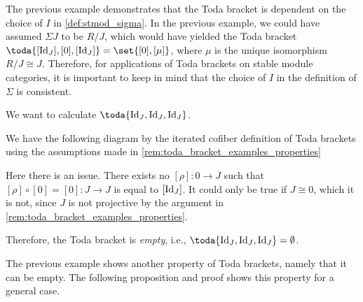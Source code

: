 The previous example demonstrates that the Toda bracket is dependent on the choice of \( I \) in \autoref{def:stmod_sigma}. In the previous example, we could have assumed \( \Sigma J \) to be \( R/J \), which would have yielded the Toda bracket \( \toda{[\Id_J], [0], [\Id_J]} = \set{[0], [\mu]} \), where \( \mu \) is the unique isomorphism \( R/J \cong J \). Therefore, for applications of Toda brackets on stable module categories, it is important to keep in mind that the choice of \( I \) in the definition of \( \Sigma \) is consistent.

\begin{example}
	\label{ex:toda_bracket-1}
	We want to calculate \( \toda{\Id_J, \Id_J, \Id_J} \).

	We have the following diagram by the iterated cofiber definition of Toda brackets using the assumptions made in \autoref{rem:toda_bracket_examples_properties}
	\begin{center}
	\end{center}

	Here there is an issue. There exists no \( [\rho]: 0 \to J \) such that \( [\rho] \circ [0] = [0]: J \to J \) is equal to \( [\operatorname{Id}_J] \). It could only be true if \( J \cong 0 \), which it is not, since \( J \) is not projective by the argument in \autoref{rem:toda_bracket_examples_properties}.

	Therefore, the Toda bracket is \emph{empty}, i.e., \( \toda{\Id_J, \Id_J, \Id_J} = \emptyset \).
\end{example}

The previous example shows another property of Toda brackets, namely that it can be empty. The following proposition and proof shows this property for a general case.

